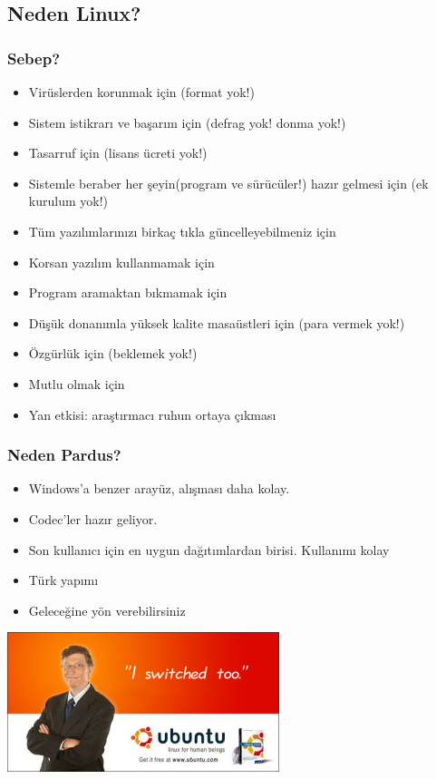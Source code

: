 \documentclass{beamer}
\begin{document}
	\subsection{Neden Linux?}
		\begin{frame}
		 	\frametitle{Sebep?}
			\begin{itemize}[<+->]
			 \item Virüslerden korunmak için (format yok!)
			 \item Sistem istikrarı ve başarım için (defrag yok! donma yok!)
			 \item Tasarruf için (lisans ücreti yok!)
			 \item Sistemle beraber her şeyin(program ve sürücüler!) hazır gelmesi için (ek kurulum yok!)
			 \item Tüm yazılımlarınızı birkaç tıkla güncelleyebilmeniz için
			 \item Korsan yazılım kullanmamak için
			 \item Program aramaktan bıkmamak için
			 \item Düşük donanımla yüksek kalite masaüstleri için (para vermek yok!)
			 \item Özgürlük için (beklemek yok!)
			 \item Mutlu olmak için
			 \item Yan etkisi: araştırmacı ruhun ortaya çıkması
			\end{itemize}

		\end{frame}
		\begin{frame}
		 	\frametitle{Neden Pardus?}
			\begin{itemize}[<+->]
			  \item Windows'a benzer arayüz, alışması daha kolay.
			  \item Codec'ler hazır geliyor.
			  \item Son kullanıcı için en uygun dağıtımlardan birisi. Kullanımı kolay
			  \item Türk yapımı
			  \item Geleceğine yön verebilirsiniz
			\end{itemize}

		\end{frame}
		\begin{frame}
		 \begin{center}
			 \includegraphics{bgl.png}
		\end{center}
		
		\end{frame}
\end{document}
